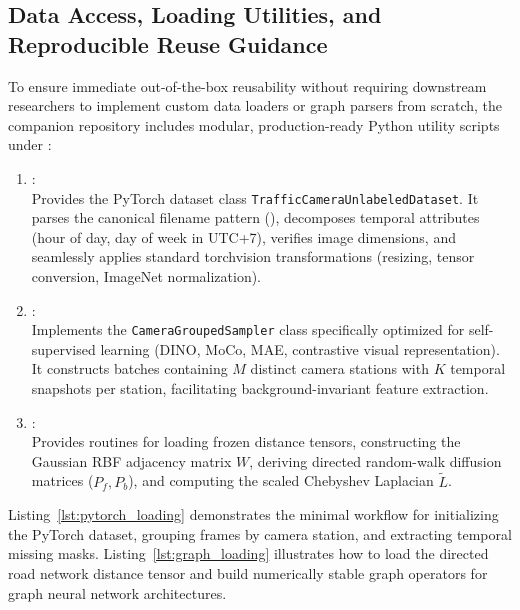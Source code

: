 \documentclass[preprint,12pt]{elsarticle}
\begin{document}
\subsection{Data Access, Loading Utilities, and Reproducible Reuse Guidance}
\label{sec:reuse_guidance}
To ensure immediate out-of-the-box reusability without requiring downstream researchers to implement custom data loaders or graph parsers from scratch, the companion repository includes modular, production-ready Python utility scripts under :
\begin{enumerate}
    \item \textbf{}: \\
    Provides the PyTorch dataset class \texttt{TrafficCameraUnlabeledDataset}. It parses the canonical filename pattern (), decomposes temporal attributes (hour of day, day of week in UTC+7), verifies image dimensions, and seamlessly applies standard torchvision transformations (resizing, tensor conversion, ImageNet normalization).
    \item \textbf{}: \\
    Implements the \texttt{CameraGroupedSampler} class specifically optimized for self-supervised learning (DINO, MoCo, MAE, contrastive visual representation). It constructs batches containing $M$ distinct camera stations with $K$ temporal snapshots per station, facilitating background-invariant feature extraction.
    \item \textbf{}: \\
    Provides routines for loading frozen distance tensors, constructing the Gaussian RBF adjacency matrix $W$, deriving directed random-walk diffusion matrices ($P_f, P_b$), and computing the scaled Chebyshev Laplacian $\tilde{L}$.
\end{enumerate}

Listing~\ref{lst:pytorch_loading} demonstrates the minimal workflow for initializing the PyTorch dataset, grouping frames by camera station, and extracting temporal missing masks. Listing~\ref{lst:graph_loading} illustrates how to load the directed road network distance tensor and build numerically stable graph operators for graph neural network architectures.
\end{document}
